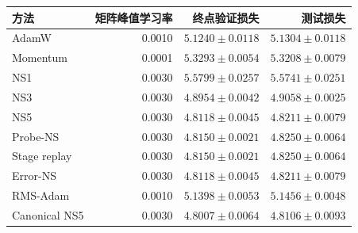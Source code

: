 \begin{tabular}{lrrr}
\toprule
方法 & 矩阵峰值学习率 & 终点验证损失 & 测试损失 \\ \midrule
AdamW & 0.0010 & $5.1240\pm0.0118$ & $5.1304\pm0.0118$ \\
Momentum & 0.0001 & $5.3293\pm0.0054$ & $5.3208\pm0.0079$ \\
NS1 & 0.0030 & $5.5799\pm0.0257$ & $5.5741\pm0.0251$ \\
NS3 & 0.0030 & $4.8954\pm0.0042$ & $4.9058\pm0.0025$ \\
NS5 & 0.0030 & $4.8118\pm0.0045$ & $4.8211\pm0.0079$ \\
Probe-NS & 0.0030 & $4.8150\pm0.0021$ & $4.8250\pm0.0064$ \\
Stage replay & 0.0030 & $4.8150\pm0.0021$ & $4.8250\pm0.0064$ \\
Error-NS & 0.0030 & $4.8118\pm0.0045$ & $4.8211\pm0.0079$ \\
RMS-Adam & 0.0010 & $5.1398\pm0.0053$ & $5.1456\pm0.0048$ \\
Canonical NS5 & 0.0030 & $4.8007\pm0.0064$ & $4.8106\pm0.0093$ \\
\bottomrule
\end{tabular}
